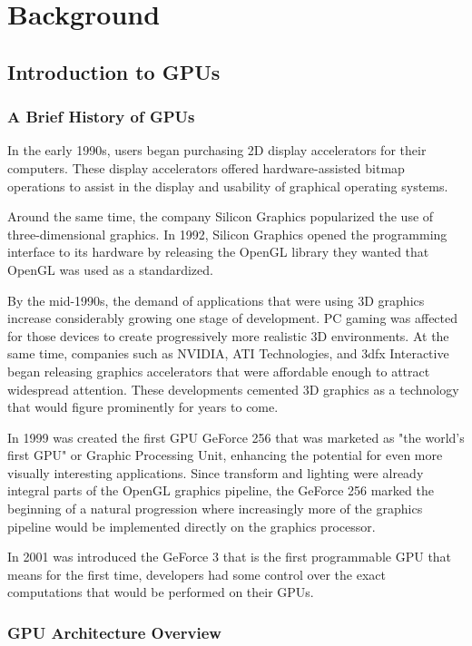 \documentclass[Ingles]{ic-tese-v1}
\begin{document}
\chapter{Background}
\label{cap:background}

\section{Introduction to GPUs}
\subsection{A Brief History of GPUs}
In the early 1990s, users began purchasing
2D display accelerators for their computers. These display accelerators
offered hardware-assisted bitmap operations to assist in the display and usability
of graphical operating systems.

Around the same time, the company Silicon Graphics popularized the use
of three-dimensional graphics. In 1992, Silicon Graphics opened the
programming interface to its hardware by releasing the OpenGL library they wanted
that OpenGL was used as a standardized.

By the mid-1990s, the demand of applications that were using 3D graphics
increase considerably growing one stage of development. PC gaming was affected
for those devices to create progressively more realistic 3D environments.
At the same time, companies such as NVIDIA, ATI Technologies,
and 3dfx Interactive began releasing graphics accelerators that were affordable
enough to attract widespread attention. These developments cemented 3D
graphics as a technology that would figure prominently for years to come.

In 1999 was created the first GPU GeForce 256 that was marketed as "the world's
first GPU" or Graphic Processing Unit, enhancing the potential
for even more visually interesting applications. Since transform and lighting were
already integral parts of the OpenGL graphics pipeline, the GeForce 256 marked
the beginning of a natural progression where increasingly more of the graphics
pipeline would be implemented directly on the graphics processor.

In 2001 was introduced the GeForce 3 that is the first programmable GPU that means
for the first time, developers had some control over the exact computations
that would be performed on their GPUs.

\subsection{GPU Architecture Overview}
\end{document}
